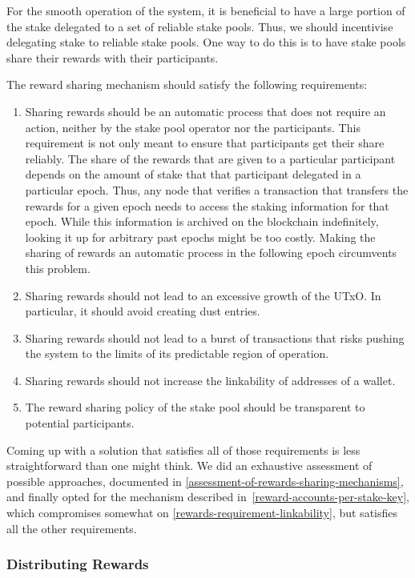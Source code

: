\documentclass[11pt,a4paper,dvipsnames,twosided]{article}
\begin{document}
For the smooth operation of the system, it is beneficial to have a large
portion of the stake delegated to a set of reliable stake pools. Thus,
we should incentivise delegating stake to reliable stake pools. One way
to do this is to have stake pools share their rewards with their
participants.

The reward sharing mechanism should satisfy the following requirements:

\begin{enumerate}
\item
  Sharing rewards should be an automatic process that does not require
  an action, neither by the stake pool operator nor the participants.
  This requirement is not only meant to ensure that participants get
  their share reliably. The share of the rewards that are given to a
  particular participant depends on the amount of stake that that
  participant delegated in a particular epoch. Thus, any node that
  verifies a transaction that transfers the rewards for a given epoch
  needs to access the staking information for that epoch. While this
  information is archived on the blockchain indefinitely, looking it up
  for arbitrary past epochs might be too costly. Making the sharing of
  rewards an automatic process in the following epoch circumvents this
  problem.
\item
  Sharing rewards should not lead to an excessive growth of the UTxO. In
  particular, it should avoid creating dust entries.
\item
  Sharing rewards should not lead to a burst of transactions that risks
  pushing the system to the limits of its predictable region of
  operation.
\item\label{rewards-requirement-linkability}
  Sharing rewards should not increase the linkability of addresses of a
  wallet.
\item
  The reward sharing policy of the stake pool should be transparent to
  potential participants.
\end{enumerate}

Coming up with a solution that satisfies all of those requirements is
less straightforward than one might think. We did an exhaustive
assessment of possible approaches, documented in
\cref{assessment-of-rewards-sharing-mechanisms}, and finally opted for
the mechanism described in~\ref{reward-accounts-per-stake-key}, which
compromises somewhat on \cref{rewards-requirement-linkability}, but
satisfies all the other requirements.

\subsubsection{Distributing Rewards}
\label{distributing-rewards}
\end{document}
